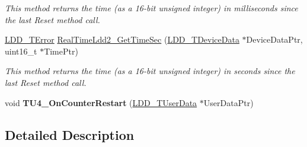 \begin{DoxyCompactItemize}
\begin{DoxyCompactList}\small\item\em This method returns the time (as a 16-\/bit unsigned integer) in milliseconds since the last Reset method call. \end{DoxyCompactList}\item 
\hyperlink{group___p_e___types__module_ga24c2b045fd04e79e85f261ce4df35588}{L\-D\-D\-\_\-\-T\-Error} \hyperlink{group___real_time_ldd2__module_ga4bb188fa300586aacb0fe28460d8b6a6}{Real\-Time\-Ldd2\-\_\-\-Get\-Time\-Sec} (\hyperlink{group___p_e___types__module_gac5cf1362f1f0e3a2ce71b1bf2276d091}{L\-D\-D\-\_\-\-T\-Device\-Data} $\ast$Device\-Data\-Ptr, uint16\-\_\-t $\ast$Time\-Ptr)
\begin{DoxyCompactList}\small\item\em This method returns the time (as a 16-\/bit unsigned integer) in seconds since the last Reset method call. \end{DoxyCompactList}\item 
\hypertarget{group___real_time_ldd2__module_ga40969d1d760fbadc1be75a4bca6391b1}{void {\bfseries T\-U4\-\_\-\-On\-Counter\-Restart} (\hyperlink{group___p_e___types__module_ga0b66a73f87238a782318aa0be7578e35}{L\-D\-D\-\_\-\-T\-User\-Data} $\ast$User\-Data\-Ptr)}\label{group___real_time_ldd2__module_ga40969d1d760fbadc1be75a4bca6391b1}

\end{DoxyCompactItemize}


\subsection{Detailed Description}


